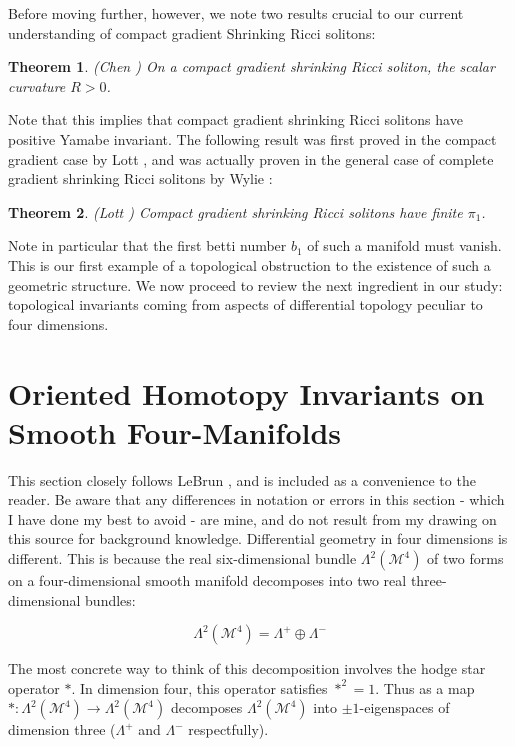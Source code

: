 \documentclass[openany, amssymb, psamsfonts]{amsart}
\newtheorem{thm}{Theorem}[section]
\theoremstyle{definition}
\numberwithin{equation}{section}
\begin{document}
 Before moving further, however, we note two results crucial to our current understanding of compact gradient Shrinking Ricci solitons:

 \begin{thm} (Chen \cite{chen})
 On a compact gradient shrinking Ricci soliton, the scalar curvature $R > 0$. 

 \end{thm}

 Note that this implies that compact gradient shrinking Ricci solitons have positive Yamabe invariant. The following result was first proved in the compact gradient case by Lott \cite{lott}, and was actually proven in the general case of complete gradient shrinking Ricci solitons by Wylie \cite{wylie}:

 \begin{thm}(Lott \cite{lott})
 Compact gradient shrinking Ricci solitons have finite $\pi_1$.

 \end{thm}

 Note in particular that the first betti number $b_1$ of such a manifold must vanish. This is our first example of a topological obstruction to the existence of such a geometric structure. We now proceed to review the next ingredient in our study: topological invariants coming from aspects of differential topology peculiar to four dimensions.

 \section{Oriented Homotopy Invariants on Smooth Four-Manifolds}

    This section closely follows LeBrun \cite{lebrun}, and is included as a convenience to the reader. Be aware that any differences in notation or errors in this section - which I have done my best to avoid - are mine, and do not result from my drawing on this source for background knowledge. Differential geometry in four dimensions is different. This is because the real six-dimensional bundle $\Lambda^2(\mathcal{M}^4)$ of two forms on a four-dimensional smooth manifold decomposes into two real three-dimensional bundles:
    
    $$\Lambda^2(\mathcal{M}^4) = \Lambda^+ \oplus \Lambda^-$$

    The most concrete way to think of this decomposition involves the hodge star operator $*$. In dimension four, this operator satisfies $*^2 = 1$. Thus as a map $*: \Lambda^2(\mathcal{M}^4) \rightarrow \Lambda^2(\mathcal{M}^4)$ decomposes $\Lambda^2(\mathcal{M}^4)$ into $\pm 1$-eigenspaces of dimension three ($\Lambda^+$ and $\Lambda^-$ respectfully). 
\end{document}
